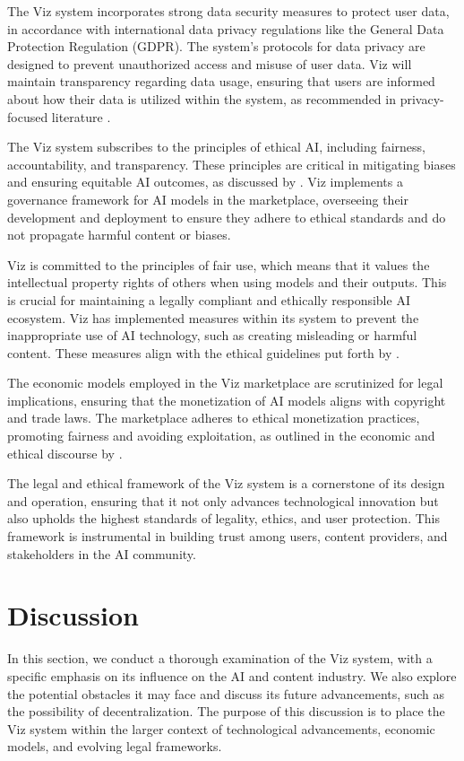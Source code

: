 \documentclass{article}
\begin{document}
The Viz system incorporates strong data security measures to protect user data, in accordance with international data privacy regulations like the General Data Protection Regulation (GDPR). The system's protocols for data privacy are designed to prevent unauthorized access and misuse of user data. Viz will maintain transparency regarding data usage, ensuring that users are informed about how their data is utilized within the system, as recommended in privacy-focused literature \citep{cavoukian2009privacy}.

The Viz system subscribes to the principles of ethical AI, including fairness, accountability, and transparency. These principles are critical in mitigating biases and ensuring equitable AI outcomes, as discussed by \citep{dignum2019responsible}. Viz implements a governance framework for AI models in the marketplace, overseeing their development and deployment to ensure they adhere to ethical standards and do not propagate harmful content or biases.

Viz is committed to the principles of fair use, which means that it values the intellectual property rights of others when using models and their outputs. This is crucial for maintaining a legally compliant and ethically responsible AI ecosystem. Viz has implemented measures within its system to prevent the inappropriate use of AI technology, such as creating misleading or harmful content. These measures align with the ethical guidelines put forth by \cite{jobin2019global}.

The economic models employed in the Viz marketplace are scrutinized for legal implications, ensuring that the monetization of AI models aligns with copyright and trade laws. The marketplace adheres to ethical monetization practices, promoting fairness and avoiding exploitation, as outlined in the economic and ethical discourse by \cite{lanier2014owns}.

The legal and ethical framework of the Viz system is a cornerstone of its design and operation, ensuring that it not only advances technological innovation but also upholds the highest standards of legality, ethics, and user protection. This framework is instrumental in building trust among users, content providers, and stakeholders in the AI community.

\section{Discussion}

In this section, we conduct a thorough examination of the Viz system, with a specific emphasis on its influence on the AI and content industry. We also explore the potential obstacles it may face and discuss its future advancements, such as the possibility of decentralization. The purpose of this discussion is to place the Viz system within the larger context of technological advancements, economic models, and evolving legal frameworks.
\end{document}
